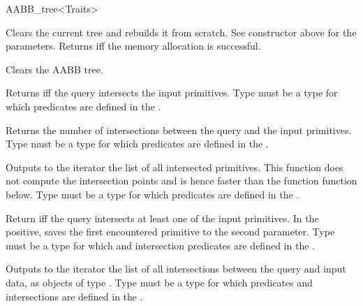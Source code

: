\begin{ccRefClass}{AABB_tree<Traits>}
\ccOperations

{Clears the current tree and rebuilds it from scratch. See constructor above for the parameters. Returns  iff the memory allocation is successful. }

{Clears the AABB tree. }


{ Returns  iff the query intersects the input primitives. Type  must be a type for which  predicates are defined in the .}
	
{Returns the number of intersections between the query and the input primitives. Type  must be a type for which  predicates are defined in the .}

{Outputs to the iterator the list of all intersected primitives. This function does not compute the intersection points and is hence faster than the function  function below. Type  must be a type for which  predicates are defined in the .}

{Return  iff the query intersects at least one of the input primitives. In the positive, saves the first encountered primitive to the second parameter. Type  must be a type for which  and intersection predicates are defined in the .}

	
{Outputs to the iterator the list of all intersections between the query and input data, as objects of type . Type  must be a type for which  predicates and intersections are defined in the .}


\end{ccRefClass}

